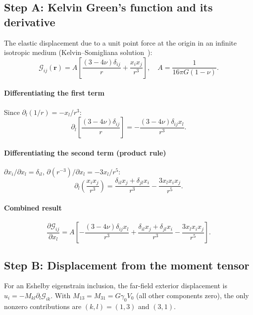 \documentclass[3p]{elsarticle}
\newcommand{\gz}{\gamma_0}
\begin{document}
\subsection{Step A: Kelvin Green's function and its derivative}
\label{sec:stepA}

The elastic displacement due to a unit point force at the origin in an
infinite isotropic medium (Kelvin--Somigliana solution~\citep{mura1987}):
\begin{equation}
  \mathcal G_{ij}(\mathbf r)=A\!\left[\frac{(3-4\nu)\delta_{ij}}{r}
  +\frac{x_ix_j}{r^3}\right],\quad A=\frac{1}{16\pi G(1-\nu)}.
  \label{eq:Gij}
\end{equation}

\paragraph{Differentiating the first term}
Since $\partial_l(1/r)=-x_l/r^3$:
\[
  \partial_l\!\left[\frac{(3-4\nu)\delta_{ij}}{r}\right]
  =-\frac{(3-4\nu)\delta_{ij}x_l}{r^3}.
\]

\paragraph{Differentiating the second term (product rule)}
$\partial x_i/\partial x_l=\delta_{il}$, $\partial(r^{-3})/\partial x_l=-3x_l/r^5$:
\[
  \partial_l\!\left(\frac{x_ix_j}{r^3}\right)
  =\frac{\delta_{il}x_j+\delta_{jl}x_i}{r^3}-\frac{3x_lx_ix_j}{r^5}.
\]

\paragraph{Combined result}
\begin{equation}
  \frac{\partial\mathcal G_{ij}}{\partial x_l}
  =A\!\left[-\frac{(3-4\nu)\delta_{ij}x_l}{r^3}
    +\frac{\delta_{il}x_j+\delta_{jl}x_i}{r^3}
    -\frac{3x_lx_ix_j}{r^5}\right].
  \label{eq:dG}
\end{equation}

\subsection{Step B: Displacement from the moment tensor}
\label{sec:stepB}

For an Eshelby eigenstrain inclusion, the far-field exterior
displacement is~\citep{eshelby1957,mura1987} $u_i=-M_{kl}\partial_l\mathcal G_{ik}$.
With $M_{13}=M_{31}=G\gz V_0$ (all other components zero),
the only nonzero contributions are $(k,l)=(1,3)$ and $(3,1)$.
\end{document}
